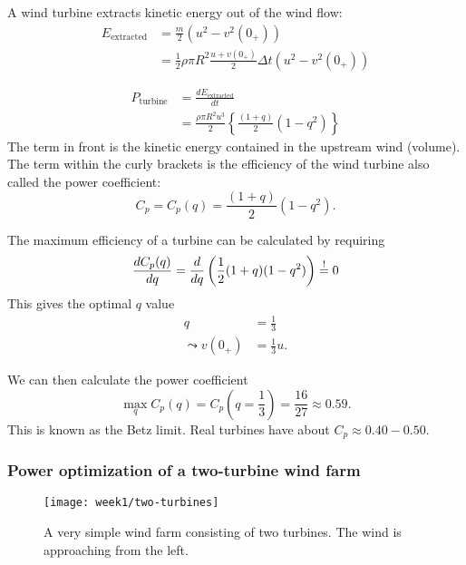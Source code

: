 A wind turbine extracts kinetic energy out of the wind flow:
\begin{align}
    E_\mathrm{extracted} &= \frac{m}{2} \left(u^2-v^2(0_+)\right)\\
    &= \frac{1}{2}\rho\pi R^2\frac{u+v(0_+)}{2}\Delta t (u^2-v^2(0_+))
    \label{}
\end{align}

\begin{align}
    P_\mathrm{turbine} &= \frac{d E_\mathrm{extracted}}{dt}\\
    &= \frac{\rho\pi R^2 u^3}{2} \left\{\frac{\left(1+q\right)}{2}\left(1-q^2\right)\right\}
    \label{}
\end{align}
The term in front is the kinetic energy contained in the upstream wind (volume). The term within the curly brackets is the efficiency of the wind turbine also called the power coefficient:
\begin{equation}
    C_p = C_p(q) = \frac{\left(1+q\right)}{2}\left(1-q^2\right).
    \label{}
\end{equation}

The maximum efficiency of a turbine can be calculated by requiring
\begin{equation}
\frac{d C_p(q)}{d q} = \frac{d }{d q} \left(\frac{1}{2} (1+q)(1-q^2)\right) \overset{!}{=} 0
\label{eq:power-coefficient}
\end{equation}
This gives the optimal $q$ value
\begin{align}
q &= \frac{1}{3}\\
\leadsto
v(0_+) &= \frac{1}{3}u.
\end{align}

We can then calculate the power coefficient
\begin{equation}
\max_q C_p(q) = C_p(q=\frac{1}{3}) = \frac{16}{27} \approx 0.59.
\end{equation}
This is known as the Betz limit. Real turbines have about $C_p \approx 0.40-0.50$.


\subsubsection{Power optimization of a two-turbine wind farm}
\begin{figure}[h!]
    \centering
    \texttt{[image: week1/two-turbines]}
    \caption{A very simple wind farm consisting of two turbines. The wind is approaching from the left.}
    \label{fig:two-turbines}
\end{figure}

